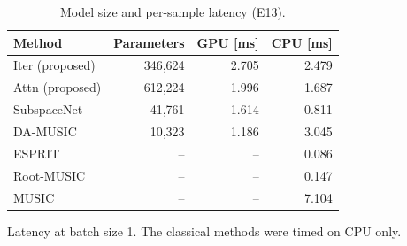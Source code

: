 \begin{table}[h!]
\centering
\small
\caption{Model size and per-sample latency (E13).}
\label{tab:complexity}
\begin{tabular}{lrrr}
\toprule
Method & Parameters & GPU [ms] & CPU [ms] \\
\midrule
Iter (proposed) & 346,624 & 2.705 & 2.479 \\
Attn (proposed) & 612,224 & 1.996 & 1.687 \\
SubspaceNet & 41,761 & 1.614 & 0.811 \\
DA-MUSIC & 10,323 & 1.186 & 3.045 \\
\midrule
ESPRIT & -- & -- & 0.086 \\
Root-MUSIC & -- & -- & 0.147 \\
MUSIC & -- & -- & 7.104 \\
\hline
\end{tabular}
\par\smallskip\parbox{0.95\textwidth}{\footnotesize Latency at batch size 1. The classical methods were timed on CPU only.}
\end{table}

